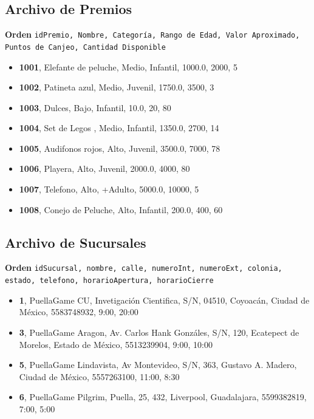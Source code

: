 \documentclass[12pt]{article}
\begin{document}
\subsection*{Archivo de Premios}
\textbf{Orden} \texttt{idPremio, Nombre, Categoría, Rango de Edad, Valor Aproximado, Puntos de Canjeo, Cantidad Disponible}
\begin{itemize}
    \item \textbf{1001}, Elefante de peluche, Medio, Infantil, 1000.0, 2000, 5
    \item \textbf{1002}, Patineta azul, Medio, Juvenil, 1750.0, 3500, 3
    \item \textbf{1003}, Dulces, Bajo, Infantil, 10.0, 20, 80
    \item \textbf{1004}, Set de Legos , Medio, Infantil, 1350.0, 2700, 14
    \item \textbf{1005}, Audifonos rojos, Alto, Juvenil, 3500.0, 7000, 78
    \item \textbf{1006}, Playera, Alto, Juvenil, 2000.0, 4000, 80
    \item \textbf{1007}, Telefono, Alto, +Adulto, 5000.0, 10000, 5
    \item \textbf{1008}, Conejo de Peluche, Alto, Infantil, 200.0, 400, 60
\end{itemize}

\subsection*{Archivo de Sucursales}
\textbf{Orden} \texttt{idSucursal, nombre, calle, numeroInt, numeroExt, colonia, estado, telefono, horarioApertura, horarioCierre}
\begin{itemize}
    \item \textbf{1}, PuellaGame CU, Invetigación Cientifica, S/N, 04510, Coyoacán, Ciudad de México, 5583748932, 9:00, 20:00
    \item \textbf{3}, PuellaGame Aragon, Av. Carlos Hank Gonzáles, S/N, 120, Ecatepect de Morelos, Estado de México, 5513239904, 9:00, 10:00
    \item \textbf{5}, PuellaGame Lindavista, Av Montevideo, S/N, 363, Gustavo A. Madero, Ciudad de México, 5557263100, 11:00, 8:30
    \item \textbf{6}, PuellaGame Pilgrim, Puella, 25, 432, Liverpool, Guadalajara, 5599382819, 7:00, 5:00
\end{itemize}
\end{document}
